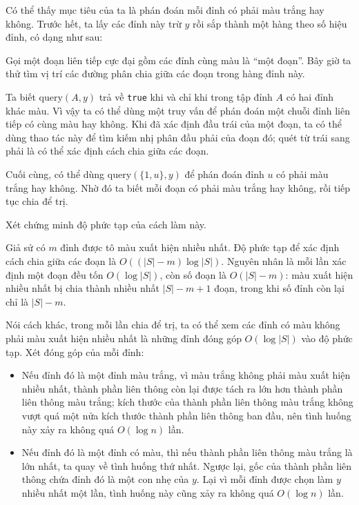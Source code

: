 \documentclass[11pt]{article}
\begin{document}
Có thể thấy mục tiêu của ta là phán đoán mỗi đỉnh có phải màu trắng hay không.
Trước hết, ta lấy các đỉnh này trừ \(y\) rồi sắp thành một hàng theo số hiệu
đỉnh, có dạng như sau:

\begin{center}
\end{center}

Gọi một đoạn liên tiếp cực đại gồm các đỉnh cùng màu là ``một đoạn''. Bây giờ
ta thử tìm vị trí các đường phân chia giữa các đoạn trong hàng đỉnh này.

Ta biết \(\mathrm{query}(A,y)\) trả về \texttt{true} khi và chỉ khi trong tập
đỉnh \(A\) có hai đỉnh khác màu. Vì vậy ta có thể dùng một truy vấn để phán
đoán một chuỗi đỉnh liên tiếp có cùng màu hay không. Khi đã xác định đầu trái
của một đoạn, ta có thể dùng thao tác này để tìm kiếm nhị phân đầu phải của
đoạn đó; quét từ trái sang phải là có thể xác định cách chia giữa các đoạn.

Cuối cùng, có thể dùng \(\mathrm{query}(\{1,u\},y)\) để phán đoán đỉnh \(u\) có
phải màu trắng hay không. Nhờ đó ta biết mỗi đoạn có phải màu trắng hay không,
rồi tiếp tục chia để trị.

Xét chứng minh độ phức tạp của cách làm này.

Giả sử có \(m\) đỉnh được tô màu xuất hiện nhiều nhất. Độ phức tạp để xác định
cách chia giữa các đoạn là \(O((|S|-m)\log |S|)\). Nguyên nhân là mỗi lần xác
định một đoạn đều tốn \(O(\log |S|)\), còn số đoạn là \(O(|S|-m)\): màu xuất
hiện nhiều nhất bị chia thành nhiều nhất \(|S|-m+1\) đoạn, trong khi số đỉnh còn
lại chỉ là \(|S|-m\).

Nói cách khác, trong mỗi lần chia để trị, ta có thể xem các đỉnh có màu không
phải màu xuất hiện nhiều nhất là những đỉnh đóng góp \(O(\log |S|)\) vào độ phức
tạp. Xét đóng góp của mỗi đỉnh:

\begin{itemize}
  \item Nếu đỉnh đó là một đỉnh màu trắng, vì màu trắng không phải màu xuất hiện
  nhiều nhất, thành phần liên thông còn lại được tách ra lớn hơn thành phần
  liên thông màu trắng; kích thước của thành phần liên thông màu trắng không
  vượt quá một nửa kích thước thành phần liên thông ban đầu, nên tình huống này
  xảy ra không quá \(O(\log n)\) lần.
  \item Nếu đỉnh đó là một đỉnh có màu, thì nếu thành phần liên thông màu trắng
  là lớn nhất, ta quay về tình huống thứ nhất. Ngược lại, gốc của thành phần
  liên thông chứa đỉnh đó là một con nhẹ của \(y\). Lại vì mỗi đỉnh được chọn
  làm \(y\) nhiều nhất một lần, tình huống này cũng xảy ra không quá
  \(O(\log n)\) lần.
\end{itemize}
\end{document}

